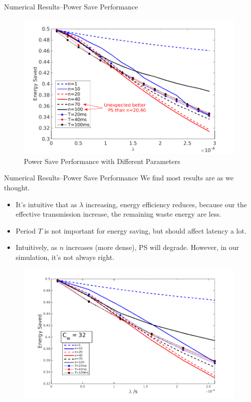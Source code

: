 \documentclass[10pt]{beamer}
\begin{document}
\begin{frame}{Numerical Results--Power Save Performance}
\begin{figure}
\includegraphics[scale=0.45]{./figure/test_per.png}
\caption{Power Save Performance with Different Parameters}
\label{test_per}
\end{figure}
\end{frame}

\begin{frame}{Numerical Results--Power Save Performance}
We find most results are as we thought. 
\begin{itemize}
\item
It's intuitive that as $\lambda$ increasing, energy efficiency reduces, because our the effective transmission increase, the remaining waste energy are less.
\item 
Period $T$ is not important for energy saving, but should affect latency a lot.
\item
Intuitively, as $n$ increases (more dense), PS will degrade. However, in our simulation, it's not always right. 
\end{itemize}
\begin{figure}
\includegraphics[scale=0.26]{./figure/test_per_2.png}
\end{figure}
\end{frame}
\end{document}
